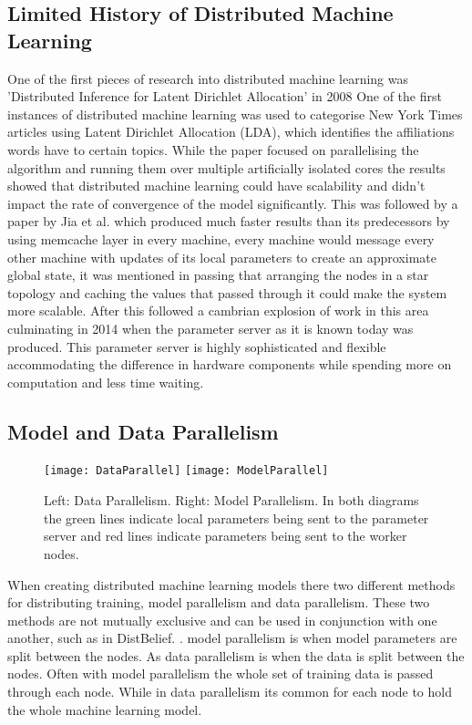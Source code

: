 \subsection{Limited History of Distributed Machine Learning}
One of the first pieces of research into distributed machine learning was
’Distributed Inference for Latent Dirichlet Allocation’ in 2008
\cite{newman2008distributed} One of the first instances of distributed machine
learning  was  used  to  categorise  New York  Times  articles  using  Latent
Dirichlet Allocation (LDA), which identifies the affiliations words have to
certain topics.  While the paper focused on parallelising the algorithm and
running them over multiple artificially isolated cores the results showed that
distributed machine learning could have scalability and didn’t impact the rate
of convergence of the model significantly. This was followed by a paper by Jia
et al. \cite{ParallelTopicModels} which produced much faster results than its
predecessors by using memcache layer in every machine, every machine would
message every other machine with updates of its local parameters to create an
approximate global state, it was mentioned in passing that arranging the nodes
in a star topology and caching the values that passed through it could make the
system more scalable. After this followed a cambrian explosion of work in this
area \cite{Ahmed2012YahooLDA, li2014communication, Dean2012Distbelief,
googlemapreduce2008} culminating in 2014 when the parameter server as it is
known today \cite{LI2014ParameterServers} was produced. This parameter server is
highly sophisticated and flexible accommodating the difference in hardware
components while spending more on computation and less time waiting.



\subsection{Model and Data Parallelism}
\begin{figure}[h]
    \centering
    \texttt{[image: DataParallel]}
    \texttt{[image: ModelParallel]}
    \caption{Left: Data Parallelism. Right: Model Parallelism. In both diagrams
        the green lines indicate local parameters being sent to the parameter
        server and red lines indicate parameters being sent to the worker nodes.}
\end{figure}
When creating distributed machine learning models there two different methods
for distributing training, model parallelism and data parallelism. These two
methods are not mutually exclusive and can be used in conjunction with one
another, such as in DistBelief. \cite{Dean2012Distbelief}. model parallelism is
when model parameters are split between the nodes. As data parallelism is when
the data is split between the nodes. \cite{Xing2015Petuum} Often with model
parallelism the whole set of training data is passed through each node. While in
data parallelism its common for each node to hold the whole machine learning
model.

